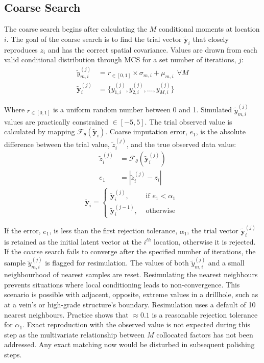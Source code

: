 \subsection{Coarse Search}
\label{subsec:05coarse}

The coarse search begins after calculating the $M$ conditional moments at location $i$. The goal of the coarse search is to find the trial vector $\tilde{\mathbf{y}}_{i}$ that closely reproduces $z_{i}$ and has the correct spatial covariance. Values are drawn from each valid conditional distribution through \gls{MCS} for a set number of iterations, $j$:
\begin{align}
    \tilde{y}_{m, i}^{(j)}       & = r_{\in[0,1]} \times \sigma_{m,i} + \mu_{m,i} \ \ \forall M \\
    \tilde{\mathbf{y}}_{i}^{(j)} & = \{ y_{1, i}^{(j)}, y_{2, i}^{(j)}, \dots, y_{M, i}^{(j)}\}
\end{align}

Where $r_{\in[0,1]}$ is a uniform random number between 0 and 1. Simulated $\tilde{y}_{m, i}^{(j)}$ values are practically constrained $\in[-5, 5]$. The trial observed value is calculated by mapping $\mathcal{F}_{\theta}(\tilde{\mathbf{y}}_{i})$. Coarse imputation error, $e_{1}$, is the absolute difference between the trial value, $\tilde{z}_{i}^{(j)}$, and the true observed data value:
\begin{align}
    \tilde{z}_{i}^{(j)} & = \mathcal{F}_{\theta}(\tilde{\mathbf{y}}_{i}^{(j)}) \\
    e_{1}               & = |\tilde{z}_{i}^{(j)} - z_{i}|
\end{align}
\begin{equation}
    \tilde{\mathbf{y}}_{i} =
    \begin{cases}
        \tilde{\mathbf{y}}_{i}^{(j)},   & \text{ if }e_{1} < \alpha_{1} \\
        \tilde{\mathbf{y}}_{i}^{(j-1)}, & \text{ otherwise }
    \end{cases}
\end{equation}

If the error, $e_{1}$, is less than the first rejection tolerance, $\alpha_{1}$, the trial vector $\tilde{\mathbf{y}}_{i}^{(j)}$ is retained as the initial latent vector at the $i^{th}$ location, otherwise it is rejected. If the coarse search fails to converge after the specified number of iterations, the sample $\tilde{y}_{m, i}^{(j)}$ is flagged for resimulation. The values of both $\tilde{y}_{m, i}^{(j)}$ and a small neighbourhood of nearest samples are reset. Resimulating the nearest neighbours prevents situations where local conditioning leads to non-convergence. This scenario is possible with adjacent, opposite, extreme values in a drillhole, such as at a vein's or high-grade structure's boundary. Resimulation uses a default of 10 nearest neighbours. Practice shows that $\approx 0.1$ is a reasonable rejection tolerance for $\alpha_{1}$. Exact reproduction with the observed value is not expected during this step as the multivariate relationship between $M$ collocated factors has not been addressed. Any exact matching now would be disturbed in subsequent polishing steps.



